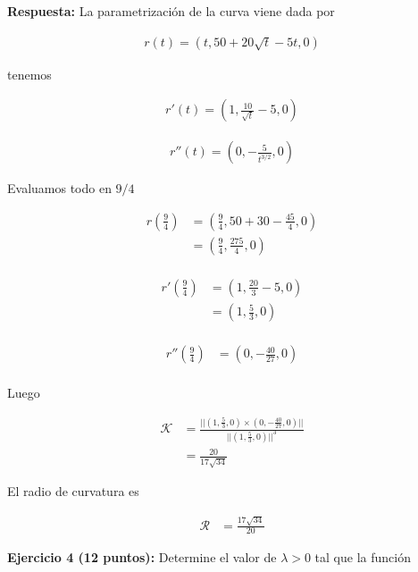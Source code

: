 \documentclass[a4paper]{article}
\begin{document}
\textbf{Respuesta: } La parametrización de la curva viene dada por

\begin{align*}
    r(t) = (t,50+20\sqrt{t}-5t,0)
\end{align*}


tenemos


\begin{align*}
    r'(t) = \left( 1,\frac{10}{\sqrt{t}}-5,0 \right)
\end{align*}

\begin{align*}
    r''(t) = \left( 0,-\frac{5}{t^{3/2}},0 \right)
\end{align*}


Evaluamos todo en $9/4$

\begin{align*}
    r\left( \frac{9}{4} \right) &= \left( \frac{9}{4},50+30-\frac{45}{4},0 \right) \\
    &= \left( \frac{9}{4},\frac{275}{4},0 \right) \\
\end{align*}


\begin{align*}
    r' \left( \frac{9}{4} \right) &= \left( 1,\frac{20}{3}-5,0 \right) \\
    &= \left( 1,\frac{5}{3},0 \right)\\
\end{align*}


\begin{align*}
    r'' \left( \frac{9}{4} \right)  &= \left( 0,-\frac{40}{27},0 \right)\\
\end{align*}

Luego

\begin{align*}
    \mathcal{K} &= \frac{|| \left( 1,\frac{5}{3},0 \right) \times \left( 0,-\frac{40}{27},0 \right)|| }{||\left( 1,\frac{5}{3},0 \right) ||^3} \\
    &= \frac{20}{17\sqrt{34}}
\end{align*}

El radio de curvatura es


\begin{align*}
    \mathcal{R}&= \frac{17\sqrt{34}}{20}
\end{align*}






\newpage


\textbf{Ejercicio 4 \textbf{(12 puntos)}:} Determine el valor de $\lambda > 0$ tal que la función
\end{document}
